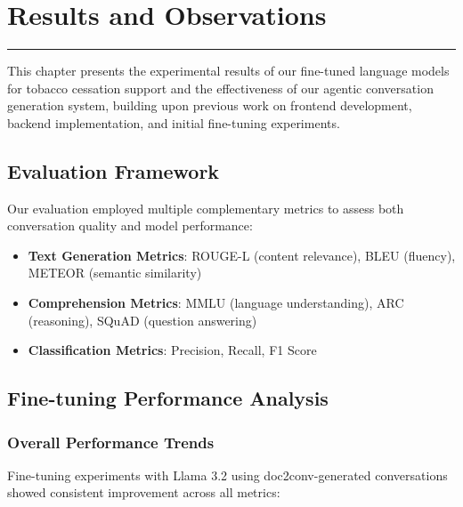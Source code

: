 \chapter{Results and Observations}
\label{Chapter6}

\begin{center}
\rule{0.5\textwidth}{0.5pt}
\end{center}

This chapter presents the experimental results of our fine-tuned language models for tobacco cessation support and the effectiveness of our agentic conversation generation system, building upon previous work on frontend development, backend implementation, and initial fine-tuning experiments.

\section{Evaluation Framework}

Our evaluation employed multiple complementary metrics to assess both conversation quality and model performance:

\begin{itemize}
    \item \textbf{Text Generation Metrics}: ROUGE-L (content relevance), BLEU (fluency), METEOR (semantic similarity)
    \item \textbf{Comprehension Metrics}: MMLU (language understanding), ARC (reasoning), SQuAD (question answering)
    \item \textbf{Classification Metrics}: Precision, Recall, F1 Score
\end{itemize}

\section{Fine-tuning Performance Analysis}

\subsection{Overall Performance Trends}

Fine-tuning experiments with Llama 3.2 using doc2conv-generated conversations showed consistent improvement across all metrics:


